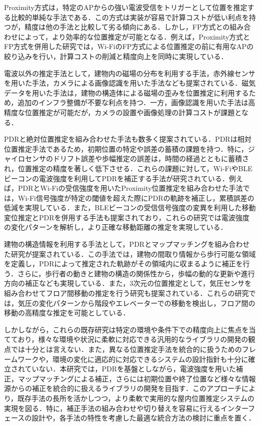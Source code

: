 Proximity方式は，特定のAPからの強い電波受信をトリガーとして位置を推定する比較的単純な手法である．この方式は実装が容易で計算コストが低い利点を持つが，精度は他の手法と比較して劣る傾向にある．しかし，FP方式との組み合わせによって，より効率的な位置推定が可能となる．例えば，Proximity方式とFP方式を併用した研究\cite{proximity-fingerprint}では，Wi-FiのFP方式による位置推定の前に有用なAPの絞り込みを行い，計算コストの削減と精度向上を同時に実現している．

電波以外の推定手法として，建物内の磁場の分布を利用する手法\cite{pdr-mag}，赤外線センサを用いた手法\cite{infrared}，カメラによる画像認識を用いた手法\cite{camera}なども提案されている．磁気データを用いた手法は，建物の構造体による磁場の歪みを位置推定に利用するため，追加のインフラ整備が不要な利点を持つ．一方，画像認識を用いた手法は高精度な位置推定が可能だが，カメラの設置や画像処理の計算コストが課題となる．

PDRと絶対位置推定を組み合わせた手法も数多く提案されている．PDRは相対位置推定手法であるため，初期位置の特定や誤差の蓄積の課題を持つ．特に，ジャイロセンサのドリフト誤差や歩幅推定の誤差は，時間の経過とともに蓄積され，位置推定の精度を著しく低下させる．これらの課題に対して，Wi-FiやBLEビーコンの電波強度を利用してPDRを補正する手法が研究されている．例えば，PDRとWi-Fiの受信強度を用いたProximity位置推定を組み合わせた手法\cite{pdr-wifi}では，Wi-Fi信号強度が特定の閾値を超えた際にPDRの軌跡を補正し，累積誤差の低減を実現している．また，BLEビーコンの受信信号強度の変異を利用した移動変位推定とPDRを併用する手法\cite{pdr-ble}も提案されており，これらの研究では電波強度の変化パターンを解析し，より正確な移動距離の推定を実現している．

建物の構造情報を利用する手法として，PDRとマップマッチングを組み合わせた研究\cite{pdr-map}が提案されている．この手法では，建物の間取り情報から歩行可能な領域を定義し，PDRによって推定された軌跡がその領域内に収まるように補正を行う．さらに，歩行者の動きと建物の構造の関係性から，歩幅の動的な更新や進行方向の補正なども実現している．また，3次元の位置推定として，気圧センサを組み合わせてフロア間移動の推定を行う研究\cite{pdr-wifi}\cite{pdr-stable}も提案されている．これらの研究では，気圧の変化パターンから階段やエレベーターでの移動を検出し，フロア間の移動の高精度な推定を可能としている．

しかしながら，これらの既存研究は特定の環境や条件下での精度向上に焦点を当てており，様々な環境や状況に柔軟に対応できる汎用的なライブラリの開発の観点では十分とは言えない．また，異なる位置推定手法を統合的に扱うためのフレームワークや，環境の変化に適応的に対応できるシステムの設計指針も十分に確立されていない．本研究では，PDRを基盤としながら，電波強度を用いた補正，マップマッチングによる補正，さらには初期位置や終了位置など様々な情報源からの補正を統合的に扱えるライブラリの開発を目指す．このアプローチにより，既存手法の長所を活かしつつ，より柔軟で実用的な屋内位置推定システムの実現を図る．特に，補正手法の組み合わせや切り替えを容易に行えるインターフェースの設計や，各手法の特性を考慮した最適な統合方法の検討に重点を置く．


